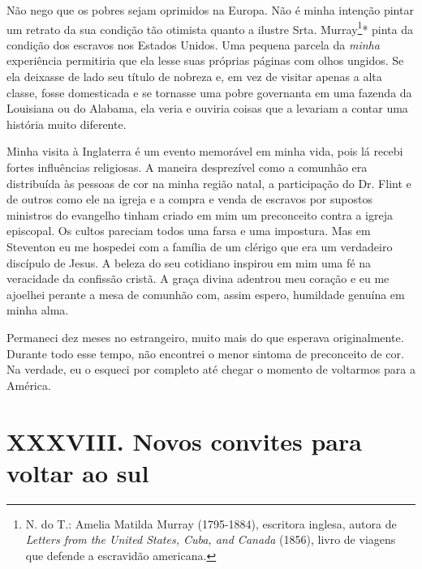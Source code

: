 Não nego que os pobres sejam oprimidos
na Europa. Não é minha intenção pintar um retrato da sua condição tão
otimista quanto a ilustre Srta. Murray\footnote{N.
  do T.: Amelia Matilda Murray (1795-1884), escritora inglesa, autora de
  \emph{Letters from the United States, Cuba, and Canada} (1856), livro
  de viagens que defende a escravidão americana.}* pinta da condição dos
escravos nos Estados Unidos. Uma pequena parcela da \emph{minha}
experiência permitiria que ela lesse suas próprias páginas com olhos
ungidos. Se ela deixasse de lado seu título de nobreza e, em vez de
visitar apenas a alta classe, fosse domesticada e se tornasse uma pobre
governanta em uma fazenda da Louisiana ou do Alabama, ela veria e
ouviria coisas que a levariam a contar uma história muito diferente.

Minha
visita à Inglaterra é um evento memorável em minha vida, pois lá recebi
fortes influências religiosas. A maneira desprezível como a comunhão era
distribuída às pessoas de cor na minha região natal, a participação do
Dr. Flint e de outros como ele na igreja e a compra e venda de escravos
por supostos ministros do evangelho tinham criado em mim um preconceito
contra a igreja episcopal. Os cultos pareciam todos uma farsa e uma
impostura. Mas em Steventon eu me hospedei com a família de um clérigo
que era um verdadeiro discípulo de Jesus. A beleza do seu cotidiano
inspirou em mim uma fé na veracidade da confissão cristã. A graça divina
adentrou meu coração e eu me ajoelhei perante a mesa de comunhão com,
assim espero, humildade genuína em minha alma.

Permaneci dez meses no estrangeiro,
muito mais do que esperava originalmente. Durante todo esse tempo, não
encontrei o menor sintoma de preconceito de cor. Na verdade, eu o
esqueci por completo até chegar o momento de voltarmos para a América.

\chapter{XXXVIII. Novos convites para voltar ao
sul}

